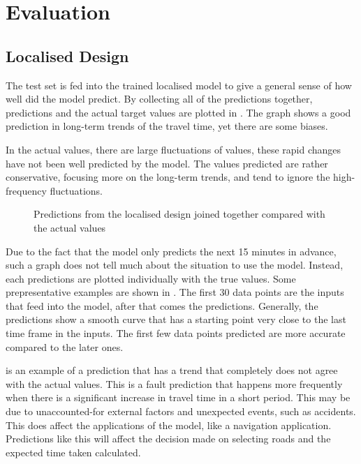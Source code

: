 \chapter{Evaluation} \label{Chapter:Evaluation}

\section{Localised Design}

The test set is fed into the trained localised model to give a general sense of how well did the model predict. 
By collecting all of the predictions together, predictions and the actual target values are plotted in .
The graph shows a good prediction in long-term trends of the travel time, yet there are some biases. 

In the actual values, there are large fluctuations of values, these rapid changes have not been well predicted by the model. 
The values predicted are rather conservative, focusing more on the long-term trends, and tend to ignore the high-frequency fluctuations. 

\begin{figure}[!htb]
    \centering
    \caption{Predictions from the localised design joined together compared with the actual values}
    \label{Figure:eva_all}
\end{figure}

Due to the fact that the model only predicts the next 15 minutes in advance, such a graph does not tell much about the situation to use the model.
Instead, each predictions are plotted individually with the true values. Some prepresentative examples are shown in .
The first 30 data points are the inputs that feed into the model, after that comes the predictions. 
Generally, the predictions show a smooth curve that has a starting point very close to the last time frame in the inputs. 
The first few data points predicted are more accurate compared to the later ones.

 is an example of a prediction that has a trend that completely does not agree with the actual values. 
This is a fault prediction that happens more frequently when there is a significant increase in travel time in a short period. 
This may be due to unaccounted-for external factors and unexpected events, such as accidents. This does affect the applications of the model, like a navigation application. 
Predictions like this will affect the decision made on selecting roads and the expected time taken calculated. 

